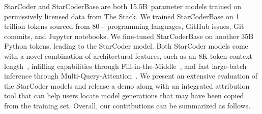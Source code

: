 StarCoder and StarCoderBase are both 15.5B~parameter models trained on permissively licensed data from The Stack. We trained StarCoderBase on 1 trillion tokens sourced from 80+ programming languages, GitHub issues, Git commits, and Jupyter notebooks. We fine-tuned StarCoderBase on another 35B Python tokens, leading to the StarCoder model. Both StarCoder models come with a novel combination of architectural features, such as an 8K token context length~\citep{dao2022flashattention}, infilling capabilities through Fill-in-the-Middle~\citep[FIM;][]{bavarian2022fim}, and fast large-batch inference through Multi-Query-Attention~\citep[MQA;][]{shazeer2019mqa}. We present an extensive evaluation of the StarCoder models and release a demo along with an integrated attribution tool that can help users locate model generations that may have been copied from the training set. Overall, our contributions can be summarized as follows.

